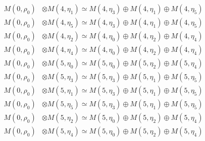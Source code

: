 \begin{align*}
M(0,\rho_{0}) &\otimes M(4,\eta_{1}) \simeq M(4,\eta_{3}) \oplus M(4,\eta_{1}) \oplus M(4,\eta_{5})\\
M(0,\rho_{0}) &\otimes M(4,\eta_{5}) \simeq M(4,\eta_{3}) \oplus M(4,\eta_{1}) \oplus M(4,\eta_{5})\\
M(0,\rho_{0}) &\otimes M(4,\eta_{2}) \simeq M(4,\eta_{0}) \oplus M(4,\eta_{2}) \oplus M(4,\eta_{4})\\
M(0,\rho_{0}) &\otimes M(4,\eta_{4}) \simeq M(4,\eta_{0}) \oplus M(4,\eta_{2}) \oplus M(4,\eta_{4})\\
M(0,\rho_{0}) &\otimes M(5,\eta_{0}) \simeq M(5,\eta_{0}) \oplus M(5,\eta_{2}) \oplus M(5,\eta_{4})\\
M(0,\rho_{0}) &\otimes M(5,\eta_{3}) \simeq M(5,\eta_{3}) \oplus M(5,\eta_{1}) \oplus M(5,\eta_{5})\\
M(0,\rho_{0}) &\otimes M(5,\eta_{1}) \simeq M(5,\eta_{3}) \oplus M(5,\eta_{1}) \oplus M(5,\eta_{5})\\
M(0,\rho_{0}) &\otimes M(5,\eta_{5}) \simeq M(5,\eta_{3}) \oplus M(5,\eta_{1}) \oplus M(5,\eta_{5})\\
M(0,\rho_{0}) &\otimes M(5,\eta_{2}) \simeq M(5,\eta_{0}) \oplus M(5,\eta_{2}) \oplus M(5,\eta_{4})\\
M(0,\rho_{0}) &\otimes M(5,\eta_{4}) \simeq M(5,\eta_{0}) \oplus M(5,\eta_{2}) \oplus M(5,\eta_{4})\\
\end{align*}

